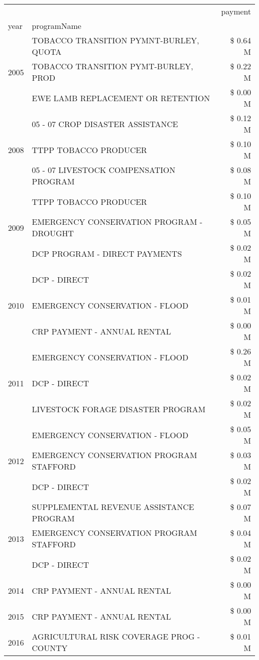 \begin{tabular}{llr}
\toprule
 &  & payment \\
year & programName &  \\
\midrule
\multirow[t]{3}{*}{2005} & TOBACCO TRANSITION PYMNT-BURLEY, QUOTA & \$ 0.64 M \\
 & TOBACCO TRANSITION PYMT-BURLEY, PROD & \$ 0.22 M \\
 & EWE LAMB REPLACEMENT OR RETENTION & \$ 0.00 M \\
\cline{1-3}
\multirow[t]{3}{*}{2008} & 05 - 07 CROP DISASTER ASSISTANCE & \$ 0.12 M \\
 & TTPP TOBACCO PRODUCER & \$ 0.10 M \\
 & 05 - 07 LIVESTOCK COMPENSATION PROGRAM & \$ 0.08 M \\
\cline{1-3}
\multirow[t]{3}{*}{2009} & TTPP TOBACCO PRODUCER & \$ 0.10 M \\
 & EMERGENCY CONSERVATION PROGRAM - DROUGHT & \$ 0.05 M \\
 & DCP PROGRAM - DIRECT PAYMENTS & \$ 0.02 M \\
\cline{1-3}
\multirow[t]{3}{*}{2010} & DCP - DIRECT & \$ 0.02 M \\
 & EMERGENCY CONSERVATION - FLOOD & \$ 0.01 M \\
 & CRP PAYMENT - ANNUAL RENTAL & \$ 0.00 M \\
\cline{1-3}
\multirow[t]{3}{*}{2011} & EMERGENCY CONSERVATION - FLOOD & \$ 0.26 M \\
 & DCP - DIRECT & \$ 0.02 M \\
 & LIVESTOCK FORAGE DISASTER PROGRAM & \$ 0.02 M \\
\cline{1-3}
\multirow[t]{3}{*}{2012} & EMERGENCY CONSERVATION - FLOOD & \$ 0.05 M \\
 & EMERGENCY CONSERVATION PROGRAM STAFFORD & \$ 0.03 M \\
 & DCP - DIRECT & \$ 0.02 M \\
\cline{1-3}
\multirow[t]{3}{*}{2013} & SUPPLEMENTAL REVENUE ASSISTANCE PROGRAM & \$ 0.07 M \\
 & EMERGENCY CONSERVATION PROGRAM STAFFORD & \$ 0.04 M \\
 & DCP - DIRECT & \$ 0.02 M \\
\cline{1-3}
2014 & CRP PAYMENT - ANNUAL RENTAL & \$ 0.00 M \\
\cline{1-3}
2015 & CRP PAYMENT - ANNUAL RENTAL & \$ 0.00 M \\
\cline{1-3}
\multirow[t]{3}{*}{2016} & AGRICULTURAL RISK COVERAGE PROG - COUNTY & \$ 0.01 M \\

\end{tabular}
